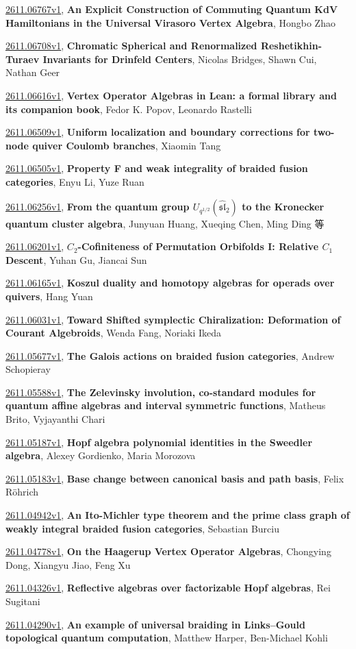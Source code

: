\documentclass[9pt, a4paper]{article}
\theoremstyle{plain}
\theoremstyle{definition}
\theoremstyle{remark}
\newcommand{\arxiv}[3]{\href{https://arxiv.org/abs/#1}{#1}, \textbf{\textcolor{arxivblue}{#2}}, #3}
\begin{document}
\arxiv{2611.06767v1}{An Explicit Construction of Commuting Quantum KdV Hamiltonians in the Universal Virasoro Vertex Algebra}{Hongbo Zhao}

\arxiv{2611.06708v1}{Chromatic Spherical and Renormalized Reshetikhin-Turaev Invariants for Drinfeld Centers}{Nicolas Bridges, Shawn Cui, Nathan Geer}

\arxiv{2611.06616v1}{Vertex Operator Algebras in Lean: a formal library and its companion book}{Fedor K. Popov, Leonardo Rastelli}

\arxiv{2611.06509v1}{Uniform localization and boundary corrections for two-node quiver Coulomb branches}{Xiaomin Tang}

\arxiv{2611.06505v1}{Property F and weak integrality of braided fusion categories}{Enyu Li, Yuze Ruan}

\arxiv{2611.06256v1}{From the quantum group $U_{q^{1/2}}( {\widehat {\mathfrak{sl}}}_2 )$ to the Kronecker quantum cluster algebra}{Junyuan Huang, Xueqing Chen, Ming Ding 等}

\arxiv{2611.06201v1}{$C_2$-Cofiniteness of Permutation Orbifolds I: Relative $C_1$ Descent}{Yuhan Gu, Jiancai Sun}

\arxiv{2611.06165v1}{Koszul duality and homotopy algebras for operads over quivers}{Hang Yuan}

\arxiv{2611.06031v1}{Toward Shifted symplectic Chiralization: Deformation of Courant Algebroids}{Wenda Fang, Noriaki Ikeda}

\arxiv{2611.05677v1}{The Galois actions on braided fusion categories}{Andrew Schopieray}

\arxiv{2611.05588v1}{The Zelevinsky involution, co-standard modules for quantum affine algebras and interval symmetric functions}{Matheus Brito, Vyjayanthi Chari}

\arxiv{2611.05187v1}{Hopf algebra polynomial identities in the Sweedler algebra}{Alexey Gordienko, Maria Morozova}

\arxiv{2611.05183v1}{Base change between canonical basis and path basis}{Felix Röhrich}

\arxiv{2611.04942v1}{An Ito-Michler type theorem and the prime class graph of weakly integral braided fusion categories}{Sebastian Burciu}

\arxiv{2611.04778v1}{On the Haagerup Vertex Operator Algebras}{Chongying Dong, Xiangyu Jiao, Feng Xu}

\arxiv{2611.04326v1}{Reflective algebras over factorizable Hopf algebras}{Rei Sugitani}

\arxiv{2611.04290v1}{An example of universal braiding in Links--Gould topological quantum computation}{Matthew Harper, Ben-Michael Kohli}
\end{document}
